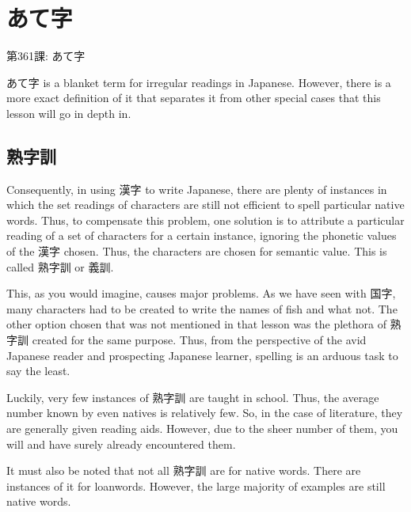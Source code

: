     
\chapter{あて字}

\begin{center}
\begin{Large}
第361課: あて字 
\end{Large}
\end{center}
 
\par{ あて字 is a blanket term for irregular readings in Japanese. However, there is a more exact definition of it that separates it from other special cases that this lesson will go in depth in. }
      
\section{熟字訓}
 
\par{ Consequently, in using 漢字 to write Japanese, there are plenty of instances in which the set readings of characters are still not efficient to spell particular native words. Thus, to compensate this problem, one solution is to attribute a particular reading of a set of characters for a certain instance, ignoring the phonetic values of the 漢字 chosen. Thus, the characters are chosen for semantic value. This is called 熟字訓 or 義訓. }

\par{ This, as you would imagine, causes major problems. As we have seen with 国字, many characters had to be created to write the names of fish and what not. The other option chosen that was not mentioned in that lesson was the plethora of 熟字訓 created for the same purpose. Thus, from the perspective of the avid Japanese reader and prospecting Japanese learner, spelling is an arduous task to say the least. }

\par{ Luckily, very few instances of 熟字訓 are taught in school. Thus, the average number known by even natives is relatively few. So, in the case of literature, they are generally given reading aids. However, due to the sheer number of them, you will and have surely already encountered them. }

\par{ It must also be noted that not all 熟字訓 are for native words. There are instances of it for loanwords. However, the large majority of examples are still native words. }

